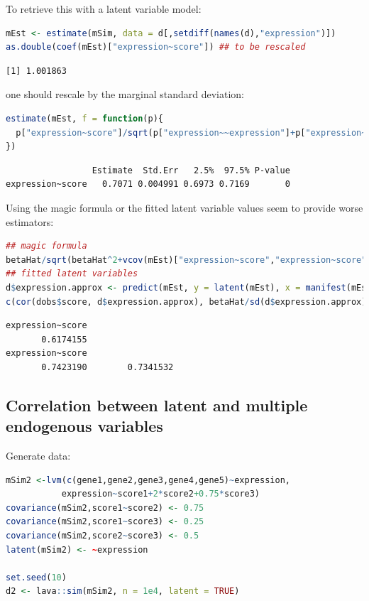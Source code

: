 \documentclass{article}
\begin{document}
To retrieve this with a latent variable model:
\begin{lstlisting}[language=r,numbers=none]
mEst <- estimate(mSim, data = d[,setdiff(names(d),"expression")])
as.double(coef(mEst)["expression~score"]) ## to be rescaled
\end{lstlisting}

\label{}
\begin{verbatim}
[1] 1.001863
\end{verbatim}


one should rescale by the marginal standard deviation:
\begin{lstlisting}[language=r,numbers=none]
estimate(mEst, f = function(p){
  p["expression~score"]/sqrt(p["expression~~expression"]+p["expression~score"]^2)
})
\end{lstlisting}

\label{}
\begin{verbatim}
                 Estimate  Std.Err   2.5%  97.5% P-value
expression~score   0.7071 0.004991 0.6973 0.7169       0
\end{verbatim}


\Warning Using the magic formula or the fitted latent variable values
seem to provide worse estimators:
\begin{lstlisting}[language=r,numbers=none]
## magic formula
betaHat/sqrt(betaHat^2+vcov(mEst)["expression~score","expression~score"]*(NROW(d)-2))
## fitted latent variables
d$expression.approx <- predict(mEst, y = latent(mEst), x = manifest(mEst))
c(cor(dobs$score, d$expression.approx), betaHat/sd(d$expression.approx))
\end{lstlisting}

\label{}
\begin{verbatim}
expression~score 
       0.6174155
expression~score 
       0.7423190        0.7341532
\end{verbatim}
\subsection{Correlation between latent and multiple endogenous variables}
\label{sec:org810d71c}

Generate data:
\begin{lstlisting}[language=r,numbers=none]
mSim2 <-lvm(c(gene1,gene2,gene3,gene4,gene5)~expression,
           expression~score1+2*score2+0.75*score3)
covariance(mSim2,score1~score2) <- 0.75
covariance(mSim2,score1~score3) <- 0.25
covariance(mSim2,score2~score3) <- 0.5
latent(mSim2) <- ~expression

set.seed(10)
d2 <- lava::sim(mSim2, n = 1e4, latent = TRUE)
\end{lstlisting}
\end{document}
